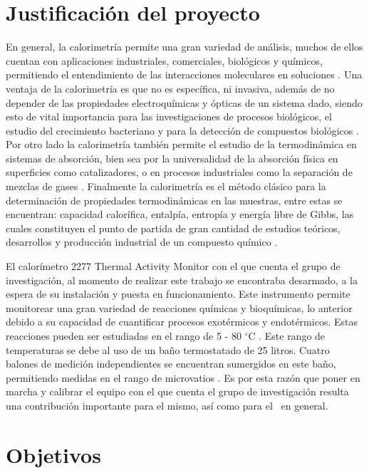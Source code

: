 \section{Justificación del proyecto}
	En general, la calorimetría permite una gran variedad de análisis, muchos de ellos cuentan con aplicaciones industriales, comerciales, biológicos y químicos, permitiendo el entendimiento de las interacciones moleculares en soluciones \cite{blandamer1998titration}. Una ventaja de la calorimetría es que no es específica, ni invasiva, además de no depender de las propiedades electroquímicas y ópticas de un sistema dado, siendo esto de vital importancia para las investigaciones de procesos biológicos, el estudio del crecimiento bacteriano y para la detección de compuestos biológicos \cite{winkelmann2004application}. Por otro lado la calorimetría también permite el estudio de la termodinámica en sistemas de absorción, bien sea por la universalidad de la absorción física en superficies como catalizadores, o en procesos industriales como la separación de mezclas de gases \cite{morrison1987calorimetry}. Finalmente la calorimetría es el método clásico para la determinación de propiedades termodinámicas en las muestras, entre estas se encuentran: capacidad calorífica, entalpía, entropía y energía libre de Gibbs, las cuales constituyen el punto de partida de gran cantidad de estudios teóricos, desarrollos y producción industrial de un compuesto químico \cite{wang2005determination, gaisford2016principles}.
	
	El calorímetro 2277 Thermal Activity Monitor con el que cuenta el grupo de investigación, al momento de realizar este trabajo se encontraba desarmado, a la espera de su instalaci\'on y puesta en funcionamiento. Este instrumento permite monitorear una gran variedad de reacciones químicas y bioquímicas, lo anterior debido a su capacidad de cuantificar procesos exotérmicos y endotérmicos. Estas reacciones pueden ser estudiadas en el rango de 5 - 80 $^\circ$C \cite{Suurkuusk}. Este rango de temperaturas se debe al uso de un baño termostatado de 25 litros. Cuatro balones de medición independientes se encuentran sumergidos en este baño, permitiendo medidas en el rango de microvatios \cite{Suurkuusk}. Es por esta razón que poner en marcha y calibrar el equipo con el que cuenta el grupo de investigación resulta una contribución importante para el mismo, así como para el \deptname\ en general.
	
\section{Objetivos}
